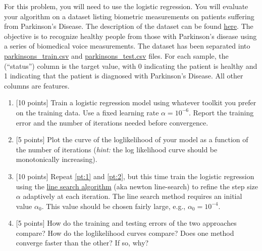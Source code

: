 \documentclass[12pt]{article}
\newenvironment{problem}[2][Problem:]{\begin{trivlist}
\item[\hskip \labelsep {\bfseries #1}\hskip \labelsep {\bfseries #2.}]}{\end{trivlist}}
\begin{document}
\pagebreak

\begin{problem}{Logistic Regression [25 points]}
For this problem, you will need to use the logistic regression.
You will evaluate your algorithm on a dataset listing biometric measurements on patients suffering from Parkinson's Disease.
The description of the dataset can be found \href{https://archive.ics.uci.edu/ml/datasets/Parkinsons}{here}.
The objective is to recognize healthy people from those with Parkinson's disease using a series of biomedical voice measurements.
The dataset has been separated into \href{https://canvas.dartmouth.edu/files/3128597/download?download_frd=1}{parkinsons\_train.csv} and \href{https://canvas.dartmouth.edu/files/3128596/download?download_frd=1}{parkinsons\_test.csv} files. 
For each sample, the (``status'') column is the target value, with 0 indicating the patient is healthy and 1 indicating that the patient is diagnosed with Parkinson's Disease. 
All other columns are features.

\begin{enumerate}
	\item {[10 points]} Train a logistic regression model using whatever toolkit you prefer on the training data. Use a fixed learning rate $\alpha = 10^{-6}$. Report the training error and the number of iterations needed before convergence. \label{pt:1}
	\item {[5 points]} Plot the curve of the loglikelihood of your model as a function of the number of iterations (\textit{hint:} the log likelihood curve should be monotonically increasing). \label{pt:2}
	\item {[10 points]} Repeat \ref{pt:1} and \ref{pt:2}, but this time train the logistic regression using the \href{https://en.wikipedia.org/wiki/Line_search}{line search algorithm} (aka newton line-search) to refine the step size $\alpha$ adaptively at each iteration. The line search method requires an initial value $\alpha_0$. This value should be chosen fairly large, e.g., $\alpha_0 = 10^{-4}$.
	\item {[5 points]} How do the training and testing errors of the two approaches compare? How do the loglikelihood curves compare? Does one method converge faster than the other? If so, why?
\end{enumerate}
\end{problem}
\end{document}
